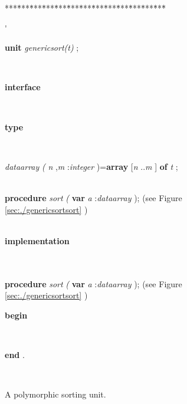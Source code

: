 {\begin{figure}

\begin{tabbing}
***\=***\=***\=***\=***\=***\=***\=***\=***\=***\=***\=***\=***\=\kill
\parbox{3.5cm}{\scriptsize{}}\'\parbox{14cm}{\textsf{\textbf{unit}  \textit{genericsort(t)}  ;}}\\
\+\parbox{14cm}{\textsf{\textbf{interface} }}\\
\<\parbox{14cm}{\textsf{\textbf{type} }}\\
\parbox{14cm}{\textsf{\textit{dataarray} \textit{(} \textit{n} ,\textit{m} :\textit{integer} )=\textbf{array} [\textit{n} ..\textit{m} ] \textbf{of}  \textit{t} ;}}\\
\<\textsf{\textbf{procedure}  \textit{sort} \textit{(} \textbf{var}  \textit{a} :\textit{dataarray} );} (see Figure \ref{sec:./genericsortsort} )\\
\\
\<\parbox{14cm}{\textsf{\textbf{implementation} }}\\
\\
\<\textsf{\textbf{procedure}  \textit{sort} \textit{(} \textbf{var}  \textit{a} :\textit{dataarray} );} (see Figure \ref{sec:./genericsortsort} )\\
\-\<\+\parbox{14cm}{\textsf{\textbf{begin} }}\\
\<\-\parbox{14cm}{\textsf{\textbf{end} .}}\\
\end{tabbing}


\caption{A polymorphic sorting unit.}\label{unit:genericsort}

\end{figure}
\begin{figure}


\end{figure}}
